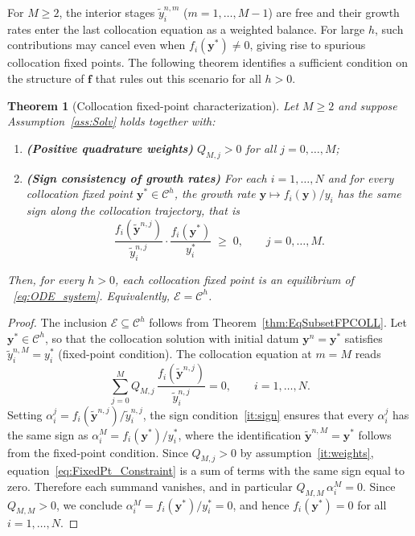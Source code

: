 \documentclass[a4paper,num-refs]{oup-contemporary-spidec}
\newtheorem{theorem}{Theorem}[section]
\begin{document}
For $M\geq 2$, the interior stages $\tilde{y}_i^{n,m}$ ($m=1,\dots,M-1$) are free and their growth rates enter the last collocation equation as a weighted balance. For large $h$, such contributions may cancel even when $f_i(\bm{y}^*)\neq 0$, giving rise to spurious collocation fixed points. The following theorem identifies a sufficient condition on the structure of $\bm{f}$ that rules out this scenario for all $h>0$.
\begin{theorem}[Collocation fixed-point characterization]
\label{thm:FP_Colloc_General}
    Let $M\geq 2$ and suppose Assumption~\ref{ass:Solv} holds together with:
    \begin{enumerate}[label=\normalfont(\roman*)]
        \item \label{it:weights}\textbf{(Positive quadrature weights)}
              $Q_{M,j}>0$ for all $j=0,\dots,M$;
        \item \label{it:sign}\textbf{(Sign consistency of growth rates)}
              For each $i=1,\dots,N$ and for every collocation fixed point
              $\bm{y}^*\in\mathcal{C}^h$, the growth rate
              $\bm{y}\mapsto f_i(\bm{y})/y_i$ has the same sign along the collocation trajectory, that is
              \begin{equation}\label{eq:SignCondition}
                  \frac{f_i\!\left(\tilde{\bm{y}}^{n,j}\right)}
                       {\tilde{y}_i^{n,j}}
                  \cdot
                  \frac{f_i(\bm{y}^*)}{y_i^*}
                  \;\geq\; 0,
                  \qquad j=0,\dots,M.
              \end{equation}
    \end{enumerate}
    Then, for every $h>0$, each collocation fixed point is an equilibrium of
    ~\eqref{eq:ODE_system}. Equivalently, $\mathcal{E}=\mathcal{C}^{h}$.
\end{theorem}
\begin{proof}
    The inclusion $\mathcal{E}\subseteq\mathcal{C}^h$ follows 
    from Theorem~\ref{thm:EqSubsetFPCOLL}. Let 
    $\bm{y}^*\in\mathcal{C}^h$, so that the collocation 
    solution with initial datum $\bm{y}^n=\bm{y}^*$ 
    satisfies $\tilde{y}_i^{n,M}=y_i^*$ (fixed-point 
    condition). The collocation equation at $m=M$ reads
    \begin{equation}\label{eq:FixedPt_Constraint}
        \sum_{j=0}^{M} Q_{M,j}\,
        \frac{f_i\!\left(\tilde{\bm{y}}^{n,j}\right)}
             {\tilde{y}_i^{n,j}}
        = 0,
        \qquad i=1,\dots,N.
    \end{equation}
    Setting $\alpha_i^j = f_i(\tilde{\bm{y}}^{n,j})/
    \tilde{y}_i^{n,j}$, the sign 
    condition~\ref{it:sign} ensures that every $\alpha_i^j$ 
    has the same sign as 
    $\alpha_i^M = f_i(\bm{y}^*)/y_i^*$, where the 
    identification $\tilde{\bm{y}}^{n,M}=\bm{y}^*$ follows 
    from the fixed-point condition. Since $Q_{M,j}>0$ by 
    assumption~\ref{it:weights}, 
    equation~\eqref{eq:FixedPt_Constraint} is a sum of 
    terms with the same sign equal to zero. Therefore each 
    summand vanishes, and in particular 
    $Q_{M,M}\,\alpha_i^M=0$. Since $Q_{M,M}>0$, we 
    conclude $\alpha_i^M = f_i(\bm{y}^*)/y_i^* = 0$, 
    and hence $f_i(\bm{y}^*)=0$ for all $i=1,\dots,N$.
\end{proof}
\end{document}
